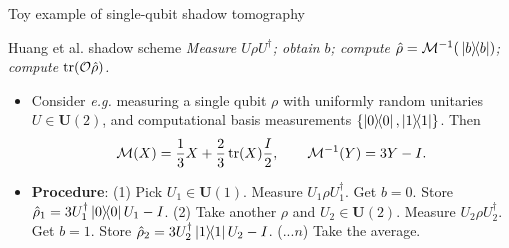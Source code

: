 \documentclass{beamer}
\begin{document}
\begin{frame}{Toy example of single-qubit shadow tomography}
    \begin{center}
    \begin{beamerboxesrounded}[shadow=true]{Huang et al. shadow scheme}
    \textit{
    Measure $U\rho U^\dagger$; 
    obtain $b$; 
    compute $\hat\rho=\mathcal M^{-1}(\ketbra*{b})$; 
    compute $\trace(\mathcal O\hat\rho)$.
    }
    \end{beamerboxesrounded}
    \end{center}
    \begin{itemize}\small
        \item Consider \textit{e.g.} measuring a single qubit $\rho$ with uniformly random unitaries $U\in\mathbf U(2)$, and computational basis measurements $\{\ketbra0,\ketbra1\}$. Then
        \begin{equation*}
            \mathcal M(X)
            = \frac13 X + \frac23 \trace(X)\frac{I}{2},
            \qquad
            \mathcal M^{-1}(Y) = 3 Y - I.
        \end{equation*}
        \item \textbf{Procedure}:
        \colorbox{yellow!10}{(1)}
        Pick $U_1\in\mathbf U(1)$. Measure $U_1\rho U_1^\dagger$. Get $b=0$. Store
        $\hat\rho_1 = 3 U_1^\dagger\ketbra*{0} U_1 - I$. %
        \colorbox{green!10}{(2)}
        Take another $\rho$ and $U_2\in\mathbf U(2)$. Measure $U_2\rho U_2^\dagger$. Get $b=1$. Store $\hat\rho_2=3U_2^\dagger\ketbra*{1} U_2-I$.
        \colorbox{red!10}{($...n$)} Take the average.
    \end{itemize}
\end{frame}
\end{document}
